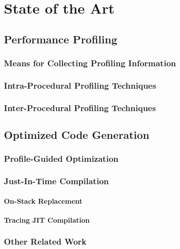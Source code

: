 \chapter{State of the Art}
\label{ch:literature}

\section{Performance Profiling}

\subsection{Means for Collecting Profiling Information}

\subsection{Intra-Procedural Profiling Techniques}

\subsection{Inter-Procedural Profiling Techniques}

\section{Optimized Code Generation}

\subsection{Profile-Guided Optimization}

\subsection{Just-In-Time Compilation}

\subsubsection{On-Stack Replacement}

\subsubsection{Tracing JIT Compilation}

\subsection{Other Related Work}

